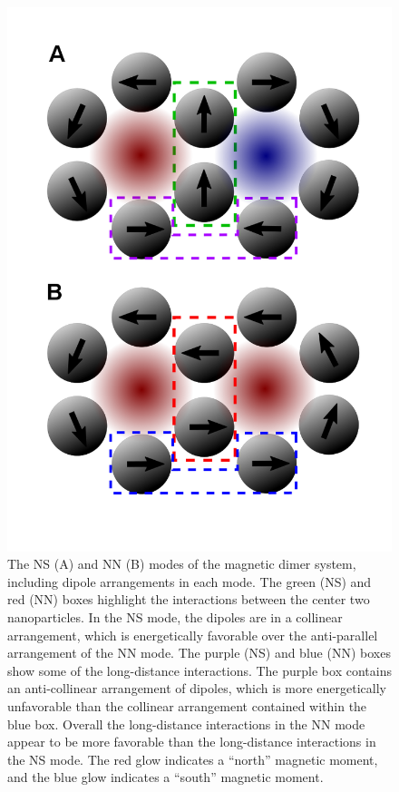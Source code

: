 \documentclass[journal=jpccck,manuscript=article]{achemso}
\begin{document}
\begin{figure}
  \begin{center}
  \includegraphics[trim = 0.5in 0.5in 0.5in 0.5in,clip=true,scale=0.4]{nn-ns-boxes_3.png}
  \caption{The NS (A) and NN (B) modes of the magnetic dimer system, including dipole arrangements in each mode. The green (NS) and red (NN) boxes highlight the interactions between the center two nanoparticles. In the NS mode, the dipoles are in a collinear arrangement, which is energetically favorable over the anti-parallel arrangement of the NN mode. The purple (NS) and blue (NN) boxes show some of the long-distance interactions. The purple box contains an anti-collinear arrangement of dipoles, which is more energetically unfavorable than the collinear arrangement contained within the blue box. Overall the long-distance interactions in the NN mode appear to be more favorable than the long-distance interactions in the NS mode. The red glow indicates a ``north'' magnetic moment, and the blue glow indicates a ``south'' magnetic moment.}
  \label{fig3}
  \end{center}
\end{figure}
\end{document}
